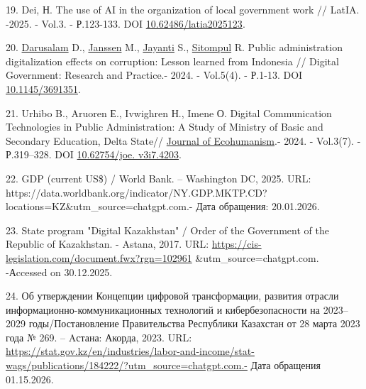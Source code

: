 \begin{refs}
19. Dei, Н. The use of AI in the organization of local government work //
LatIA. -2025. - Vol.3. - Р.123-133. DOI
\href{https://doi.org/10.62486/latia2025123}{10.62486/latia2025123}.

20. \href{https://www.researchgate.net/scientific-contributions/Darusalam-Darusalam-2146395918?_tp=eyJjb250ZXh0Ijp7ImZpcnN0UGFnZSI6ImNpdGF0aW9uRG93bmxvYWQiLCJwYWdlIjoicHVibGljYXRpb24ifX0}{Darusalam}
D.,
\href{https://www.researchgate.net/profile/Marijn-Janssen?_tp=eyJjb250ZXh0Ijp7ImZpcnN0UGFnZSI6ImNpdGF0aW9uRG93bmxvYWQiLCJwYWdlIjoicHVibGljYXRpb24ifX0}{Janssen}
M.,
\href{https://www.researchgate.net/scientific-contributions/Sri-Delasmi-Jayanti-2236563283}{Jayanti}
S.,
\href{https://www.researchgate.net/scientific-contributions/Renato-Sitompul-2229051296?_tp=eyJjb250ZXh0Ijp7ImZpcnN0UGFnZSI6ImNpdGF0aW9uRG93bmxvYWQiLCJwYWdlIjoicHVibGljYXRpb24ifX0}{Sitompul}
R. Public administration digitalization effects on corruption: Lesson
learned from Indonesia // Digital Government: Research and Practice.-
2024. - Vol.5(4). - Р.1-13. DOI
\href{https://doi.org/10.1145/3691351}{10.1145/3691351}.

21. Urhibo B., Aruoren Е., Ivwighren Н., Imene О. Digital Communication
Technologies in Public Administration: A Study of Ministry of Basic
and Secondary Education, Delta State//
\href{https://www.researchgate.net/journal/Journal-of-Ecohumanism-2752-6801?_tp=eyJjb250ZXh0Ijp7ImZpcnN0UGFnZSI6ImNpdGF0aW9uRG93bmxvYWQiLCJwYWdlIjoicHVibGljYXRpb24ifX0}{Journal
of Ecohumanism}.- 2024. - Vol.3(7). - Р.319--328. DOI
\href{https://doi.org/10.62754/joe.v3i7.4203}{10.62754/joe.
v3i7.4203}.

22. GDP (current US\$) / World Bank. -- Washington DC, 2025. URL:
https://data.worldbank.org/indicator/NY.GDP.MKTP.CD?locations=KZ\&utm\_source=chatgpt.com.-
Дата обращения: 20.01.2026.

23. State program "Digital Kazakhstan" / Order of the Government of the
Republic of Kazakhstan. - Astana, 2017. URL:
\url{https://cis-legislation.com/document.fwx?rgn=102961}
\&utm\_source=chatgpt.com. -Аccessed on 30.12.2025.

24. Об утверждении Концепции цифровой трансформации, развития отрасли
информационно-коммуникационных технологий и кибербезопасности на
2023--2029 годы/Постановление Правительства Республики
Казахстан от 28 марта 2023 года № 269. -- Aстана: Акорда, 2023. URL:
\url{https://stat.gov.kz/en/industries/labor-and-income/stat-wags/publications/184222/?utm_source=chatgpt.com.-}
Дата обращения 01.15.2026.


\end{refs}
